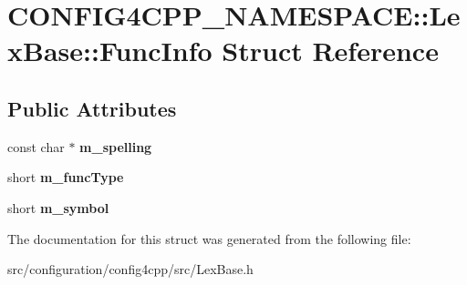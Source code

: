 \hypertarget{structCONFIG4CPP__NAMESPACE_1_1LexBase_1_1FuncInfo}{\section{C\-O\-N\-F\-I\-G4\-C\-P\-P\-\_\-\-N\-A\-M\-E\-S\-P\-A\-C\-E\-:\-:Lex\-Base\-:\-:Func\-Info Struct Reference}
\label{structCONFIG4CPP__NAMESPACE_1_1LexBase_1_1FuncInfo}
}
\subsection*{Public Attributes}
\begin{DoxyCompactItemize}
\item 
\hypertarget{structCONFIG4CPP__NAMESPACE_1_1LexBase_1_1FuncInfo_ad9997846f15ca406d44a8ef3672c575d}{const char $\ast$ {\bfseries m\-\_\-spelling}}\label{structCONFIG4CPP__NAMESPACE_1_1LexBase_1_1FuncInfo_ad9997846f15ca406d44a8ef3672c575d}

\item 
\hypertarget{structCONFIG4CPP__NAMESPACE_1_1LexBase_1_1FuncInfo_a82bf928293b95f6a1c6176a543246a9e}{short {\bfseries m\-\_\-func\-Type}}\label{structCONFIG4CPP__NAMESPACE_1_1LexBase_1_1FuncInfo_a82bf928293b95f6a1c6176a543246a9e}

\item 
\hypertarget{structCONFIG4CPP__NAMESPACE_1_1LexBase_1_1FuncInfo_a6d5df6ba6b0142701fc9cd41849973a3}{short {\bfseries m\-\_\-symbol}}\label{structCONFIG4CPP__NAMESPACE_1_1LexBase_1_1FuncInfo_a6d5df6ba6b0142701fc9cd41849973a3}

\end{DoxyCompactItemize}


The documentation for this struct was generated from the following file\-:\begin{DoxyCompactItemize}
\item 
src/configuration/config4cpp/src/Lex\-Base.\-h\end{DoxyCompactItemize}
